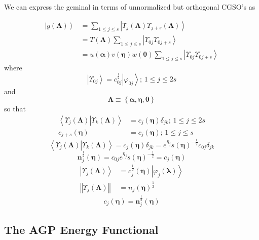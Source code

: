 \documentclass[aps,preprint]{revtex4}%
\begin{document}
We can express the geminal in terms of unnormalized but orthogonal CGSO's as%

\begin{align*}
\left\vert g\left(  \mathbf{\Lambda}\right)  \right\rangle  &  =\sum_{1\leq
j\leq s}\left\vert \Upsilon_{j}\left(  \mathbf{\Lambda}\right)  \Upsilon
_{j+s}\left(  \mathbf{\Lambda}\right)  \right\rangle \\
&  =T\left(  \mathbf{\Lambda}\right)  \sum_{1\leq j\leq s}\left\vert
\Upsilon_{0j}\Upsilon_{0j+s}\right\rangle \\
&  =u\left(  \mathbf{\alpha}\right)  v\left(  \mathbf{\eta}\right)  w\left(
\mathbf{\theta}\right)  \sum_{1\leq j\leq s}\left\vert \Upsilon_{0j}%
\Upsilon_{0j+s}\right\rangle
\end{align*}
where
\[
\left\vert \Upsilon_{0j}\right\rangle =c_{0j}^{\frac{1}{2}}\left\vert
\varphi_{0j}\right\rangle ;\,1\leq j\leq2s
\]
and
\[
\mathbf{\Lambda\equiv}\left\{  \mathbf{\alpha,\eta,\theta}\right\}
\]
so that
\begin{align*}
\left\langle \left.  \Upsilon_{j}\left(  \mathbf{\Lambda}\right)  \right\vert
\Upsilon_{k}\left(  \mathbf{\Lambda}\right)  \right\rangle  &  =c_{j}\left(
\mathbf{\eta}\right)  \delta_{jk};\,1\leq j\leq2s\\
c_{j+s}\left(  \mathbf{\eta}\right)   &  =c_{j}\left(  \mathbf{\eta}\right)
;\,1\leq j\leq s
\end{align*}%
\[
\left\langle \left.  \Upsilon_{j}\left(  \mathbf{\Lambda}\right)  \right\vert
\Upsilon_{k}\left(  \mathbf{\Lambda}\right)  \right\rangle =c_{j}\left(
\mathbf{\eta}\right)  \delta_{jk}=e^{\eta_{j}}\mathit{s}\left(  \mathbf{\eta
}\right)  ^{-\frac{1}{2}}c_{0j}\delta_{jk}%
\]%
\[
\mathbf{n}_{j}^{\frac{1}{2}}\left(  \mathbf{\eta}\right)  =c_{0j}e^{\eta_{j}%
}\mathit{s}\left(  \mathbf{\eta}\right)  ^{-\frac{1}{2}}=c_{j}\left(
\mathbf{\eta}\right)
\]%
\begin{align*}
\left\vert \Upsilon_{j}\left(  \mathbf{\Lambda}\right)  \right\rangle  &
=c_{j}^{\frac{1}{2}}\left(  \mathbf{\eta}\right)  \left\vert \varphi
_{j}\left(  \mathbf{\lambda}\right)  \right\rangle \\
\left\Vert \Upsilon_{j}\left(  \mathbf{\Lambda}\right)  \right\Vert  &
=n_{j}\left(  \mathbf{\eta}\right)  ^{\frac{1}{2}}%
\end{align*}%
\[
c_{j}\left(  \mathbf{\eta}\right)  =\mathbf{n}_{j}^{\frac{1}{2}}\left(
\mathbf{\eta}\right)
\]


\subsection{The AGP Energy Functional}%
\end{document}
